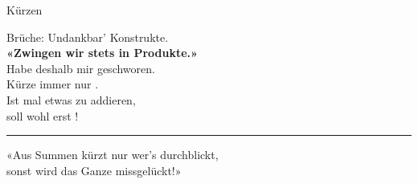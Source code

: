 \begin{rezept}{Kürzen}{}

\begin{center}
Brüche: Undankbar' Konstrukte.\\
\textbf{«Zwingen wir stets in Produkte.»}\\

Habe deshalb mir geschworen.\\
\vspace{4mm}
Kürze immer nur .\\

Ist mal etwas zu addieren,\noTRAINER{\vspace{4mm}}\\
soll wohl erst !\\
\vspace{3mm}
\hrule
\vspace{3mm}
«Aus Summen kürzt nur wer's durchblickt,\\
sonst wird das Ganze missgelückt!»\\
\end{center}
\end{rezept}

\newpage





\newpage
